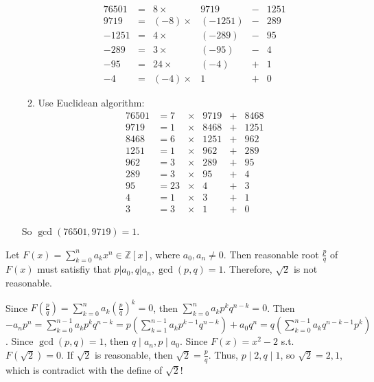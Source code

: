 \documentclass{ctexart}
\begin{document}
\begin{solution}
\begin{enumerate}
\begin{enumerate}
\[\begin{aligned}
							76501 & = & 8   \times   & 9719    & - & 1251 \\
							9719  & = & (-8)  \times & (-1251) & - & 289  \\
							-1251 & = & 4   \times   & (-289)  & - & 95   \\
							-289  & = & 3   \times   & (-95)   & - & 4    \\
							-95   & = & 24  \times   & (-4)    & + & 1    \\
							-4    & = & (-4)  \times & 1       & + & 0
						\end{aligned}
					\]
				\item Use Euclidean algorithm:\\
					\[
						\begin{aligned}
							76501 & = 7  & \times & 9719 & + & 8468 \\
							9719  & = 1  & \times & 8468 & + & 1251 \\
							8468  & = 6  & \times & 1251 & + & 962  \\
							1251  & = 1  & \times & 962  & + & 289  \\
							962   & = 3  & \times & 289  & + & 95   \\
							289   & =3   & \times & 95   & + & 4    \\
							95    & = 23 & \times & 4    & + & 3    \\
							4     & = 1  & \times & 3    & + & 1    \\
							3     & = 3  & \times & 1    & + & 0
						\end{aligned}
					\]
			\end{enumerate}
			So \(\gcd(76501,9719)=1\).
	\end{enumerate}

\end{solution}
\begin{problem}
	Let \(F(x)=\sum_{k=0}^na_kx^{n} \in \mathbb{Z}[x]\), where \(a_0,a_n \neq 0\). Then reasonable root \(\frac{p}{q}\) of \(F(x)\)
	must satisfiy that \(p | a_0, q | a_n, \gcd(p,q)=1\). Therefore, \(\sqrt{2}\) is not reasonable.

\end{problem}
\begin{solution}
	Since \(F(\frac{p}{q}) = \sum_{k=0}^na_k (\frac{p}{q})^{k}=0\), then \(\sum_{k=0}^na_kp^{k}q^{n-k}=0\).
	Then \(-a_np^n=\sum_{k=0}^{n-1}a_kp^{k}q^{n-k}=p(\sum_{k=1}^{n-1}a_kp^{k-1}q^{n-k})+a_0q^n=q(\sum_{k=0}^{n-1}a_kq^{n-k-1}p^{k})\).
	Since \(\gcd(p,q) = 1\), then \(q \mid a_n, p \mid a_0\).
	Since \(F(x)=x^2-2\) s.t. \(F(\sqrt{2}) = 0\). If \(\sqrt{2}\) is reasonable, then \(\sqrt{2} =\frac{p}{q}\).
	Thus, \(p \mid 2, q \mid 1\), so \(\sqrt{2}=2,1\), which is contradict with the define of \(\sqrt{2}\)!
\end{solution}
\end{document}
